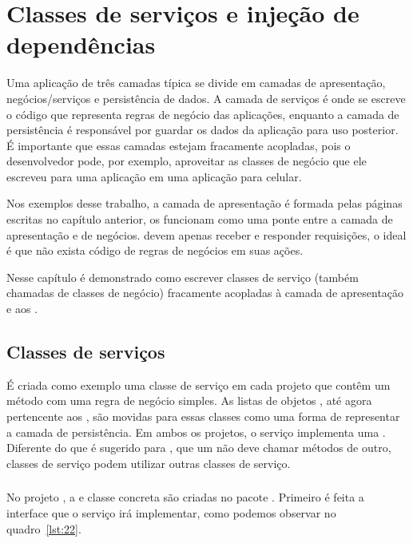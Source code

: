 \chapter{Classes de serviços e injeção de dependências}

Uma aplicação de três camadas típica se divide em camadas de apresentação, negócios/serviços e persistência de dados. A camada de serviços é onde se escreve o código que representa regras de negócio das aplicações, enquanto a camada de persistência é responsável por guardar os dados da aplicação para uso posterior. É importante que essas camadas estejam fracamente acopladas, pois o desenvolvedor pode, por exemplo, aproveitar as classes de negócio que ele escreveu para uma aplicação  em uma aplicação para celular.

Nos exemplos desse trabalho, a camada de apresentação é formada pelas páginas  escritas no capítulo anterior, os  funcionam como uma ponte entre a camada de apresentação e de negócios.  devem apenas receber e responder requisições, o ideal é que não exista código de regras de negócios em suas ações.

Nesse capítulo é demonstrado como escrever classes de serviço (também chamadas de classes de negócio) fracamente acopladas à camada de apresentação e aos . 

\section{Classes de serviços}

É criada como exemplo uma classe de serviço em cada projeto que contêm um método com uma regra de negócio simples. As listas de objetos , até agora pertencente aos , são movidas para essas classes como uma forma de representar a camada de persistência. Em ambos os projetos, o serviço implementa uma . Diferente do que é sugerido para , que um  não deve chamar métodos de outro, classes de serviço podem utilizar outras classes de serviço.

\subsection{}

No projeto , a  e classe concreta são criadas no pacote . Primeiro é feita a interface  que o serviço irá implementar, como podemos observar no quadro~\ref{lst:22}.

